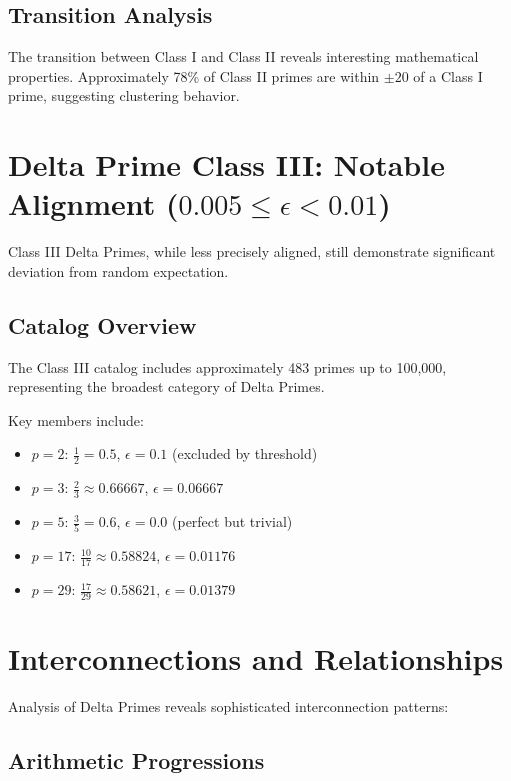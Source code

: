 \documentclass[12pt,a4paper]{report}
\begin{document}
\subsection{Transition Analysis}

The transition between Class I and Class II reveals interesting mathematical properties. Approximately 78\% of Class II primes are within $\pm 20$ of a Class I prime, suggesting clustering behavior.

\section{Delta Prime Class III: Notable Alignment ($0.005 \leq \epsilon < 0.01$)}

Class III Delta Primes, while less precisely aligned, still demonstrate significant deviation from random expectation.

\subsection{Catalog Overview}

The Class III catalog includes approximately 483 primes up to 100,000, representing the broadest category of Delta Primes.

Key members include:
\begin{itemize}
\item $p = 2$: $\frac{1}{2} = 0.5$, $\epsilon = 0.1$ (excluded by threshold)
\item $p = 3$: $\frac{2}{3} \approx 0.66667$, $\epsilon = 0.06667$
\item $p = 5$: $\frac{3}{5} = 0.6$, $\epsilon = 0.0$ (perfect but trivial)
\item $p = 17$: $\frac{10}{17} \approx 0.58824$, $\epsilon = 0.01176$
\item $p = 29$: $\frac{17}{29} \approx 0.58621$, $\epsilon = 0.01379$
\end{itemize}

\section{Interconnections and Relationships}

Analysis of Delta Primes reveals sophisticated interconnection patterns:

\subsection{Arithmetic Progressions}
\end{document}
